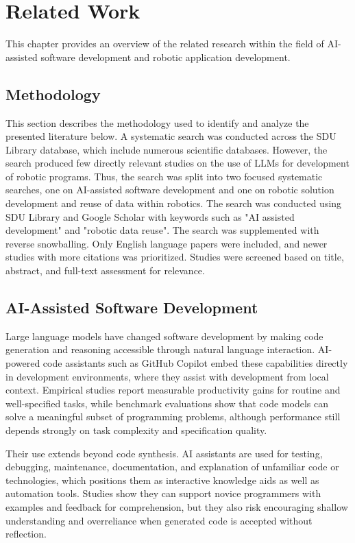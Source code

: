 \chapter{Related Work} \label{chapter:related-work}
This chapter provides an overview of the related research within the field of AI-assisted software development and robotic application development.

\section{Methodology}
This section describes the methodology used to identify and analyze the presented literature below. A systematic search was conducted across the SDU Library database, which include numerous scientific databases. \cite{SDU-Library} However, the search produced few directly relevant studies on the use of LLMs for development of robotic programs. Thus, the search was split into two focused systematic searches, one on AI-assisted software development and one on robotic solution development and reuse of data within robotics. The search was conducted using SDU Library and Google Scholar with keywords such as "AI assisted development" and "robotic data reuse". \cite{google-scholar} The search was supplemented with reverse snowballing. Only English language papers were included, and newer studies with more citations was prioritized. Studies were screened based on title, abstract, and full-text assessment for relevance.


\section{AI-Assisted Software Development}
Large language models have changed software development by making code generation and reasoning accessible through natural language interaction. AI-powered code assistants such as GitHub Copilot embed these capabilities directly in development environments, where they assist with development from local context. \cite{GitHubCopilot2026} Empirical studies report measurable productivity gains for routine and well-specified tasks, while benchmark evaluations show that code models can solve a meaningful subset of programming problems, although performance still depends strongly on task complexity and specification quality. \cite{bird2022taking, chen2021evaluating, austin2021program}

Their use extends beyond code synthesis. AI assistants are used for testing, debugging, maintenance, documentation, and explanation of unfamiliar code or technologies, which positions them as interactive knowledge aids as well as automation tools. \cite{barke2023grounded, vaithilingam2022expectation} Studies show they can support novice programmers with examples and feedback for comprehension, but they also risk encouraging shallow understanding and overreliance when generated code is accepted without reflection. \cite{kazemitabaar2023studying}

